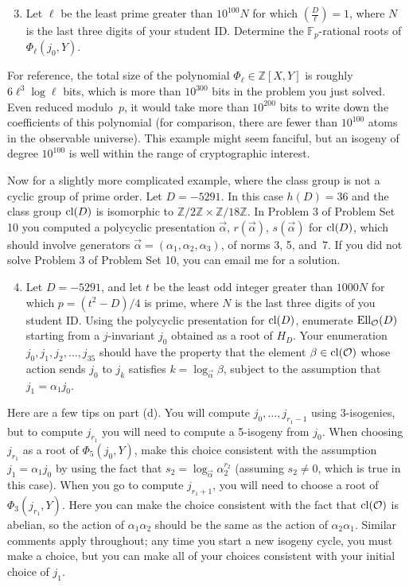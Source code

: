 \documentclass[11pt]{article}
\newcommand{\Fp}{\mathbb{F}_p}
\newcommand{\Z}{\mathbb{Z}}
\renewcommand{\O}{\mathcal{O}}
\newcommand{\EllO}{{\rm Ell}_\O}
\newcommand{\cl}{{\rm cl}}
\begin{document}
\begin{enumerate}[{\bf(a)}]
\setcounter{enumi}{2}
\item
Let $\ell$ be the least prime greater than $10^{100} N$ for which $\left(\frac{D}{\ell}\right)=1$, where $N$ is the last three digits of your student ID.
Determine the $\Fp$-rational roots of $\Phi_\ell(j_0,Y)$.
\end{enumerate}

For reference, the total size of the polynomial $\Phi_\ell\in\Z[X,Y]$ is roughly $6\ell^3\log\ell$ bits, which is more than $10^{300}$ bits in the problem you just solved.  Even reduced modulo~$p$, it would take more than $10^{200}$ bits to write down the coefficients of this polynomial (for comparison, there are fewer than $10^{100}$ atoms in the observable universe).  This example might seem fanciful, but an isogeny of degree $10^{100}$ is well within the range of cryptographic interest.

Now for a slightly more complicated example, where the class group is not a cyclic group of prime order.
Let $D=-5291$.  In this case $h(D)=36$ and the class group $\cl(D)$ is isomorphic to $\Z/2\Z\times \Z/18\Z$.  In Problem 3 of Problem Set 10 you computed a polycyclic presentation $\vec{\alpha}$, $r(\vec\alpha)$, $s(\vec\alpha)$ for $\cl(D)$, which should involve generators $\vec{\alpha}=(\alpha_1, \alpha_2, \alpha_3)$, of norms 3, 5, and~7.  If you did not solve Problem 3 of Problem Set 10, you can email me for a solution.

\begin{enumerate}[{\bf(a)}]
\setcounter{enumi}{3}
\item
Let $D=-5291$, and let $t$ be the least odd integer greater than $1000N$ for which $p=(t^2-D)/4$ is prime, where $N$ is the last three digits of you student ID.  Using the polycyclic presentation for $\cl(D)$, enumerate $\EllO(D)$ starting from a $j$-invariant $j_0$ obtained as a root of $H_D$.  Your enumeration $j_0,j_1,j_2,\ldots, j_{35}$ should have the property that the element $\beta\in\cl(\O)$ whose action sends $j_0$ to $j_k$ satisfies $k=\log_{\vec\alpha}\beta$, subject to the assumption that $j_1=\alpha_1j_0$.
\end{enumerate}

Here are a few tips on part (d).  You will compute $j_0,\ldots,j_{r_1-1}$ using 3-isogenies, but to compute $j_{r_1}$ you will need to compute a 5-isogeny from $j_0$.
When choosing $j_{r_1}$ as a root of $\Phi_5(j_0,Y)$, make this choice consistent with the assumption $j_1=\alpha_1j_0$ by using the fact that $s_2 = \log_{\vec{\alpha}}\alpha_2^{r_2}$ (assuming $s_2\ne 0$, which is true in this case).
When you go to compute $j_{r_1+1}$, you will need to choose a root of $\Phi_3(j_{r_1},Y)$.  Here you can make the choice consistent with the fact that $\cl(\O)$ is abelian, so the action of $\alpha_1\alpha_2$ should be the same as the action of $\alpha_2\alpha_1$.
Similar comments apply throughout; any time you start a new isogeny cycle, you must make a choice, but you can make all of your choices consistent with your initial choice of $j_1$.
\end{document}
